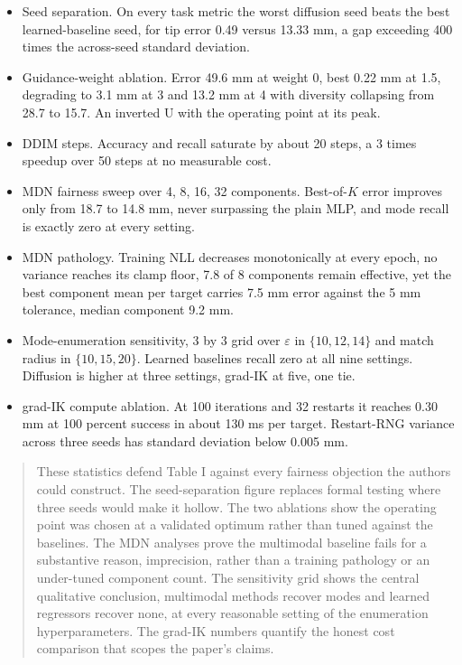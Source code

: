 \documentclass[11pt]{article}
\newcommand{\desc}[1]{\begin{quote}\small #1\end{quote}}
\begin{document}
\begin{itemize}
\item Seed separation. On every task metric the worst diffusion seed beats
the best learned-baseline seed, for tip error 0.49 versus 13.33 mm, a gap
exceeding 400 times the across-seed standard deviation.
\item Guidance-weight ablation. Error 49.6 mm at weight 0, best 0.22 mm at
1.5, degrading to 3.1 mm at 3 and 13.2 mm at 4 with diversity collapsing
from 28.7 to 15.7. An inverted U with the operating point at its peak.
\item DDIM steps. Accuracy and recall saturate by about 20 steps, a 3 times
speedup over 50 steps at no measurable cost.
\item MDN fairness sweep over 4, 8, 16, 32 components. Best-of-$K$ error
improves only from 18.7 to 14.8 mm, never surpassing the plain MLP, and
mode recall is exactly zero at every setting.
\item MDN pathology. Training NLL decreases monotonically at every epoch, no
variance reaches its clamp floor, 7.8 of 8 components remain effective, yet
the best component mean per target carries 7.5 mm error against the 5 mm
tolerance, median component 9.2 mm.
\item Mode-enumeration sensitivity, 3 by 3 grid over $\varepsilon$ in
$\{10,12,14\}$ and match radius in $\{10,15,20\}$. Learned baselines recall
zero at all nine settings. Diffusion is higher at three settings, grad-IK at
five, one tie.
\item grad-IK compute ablation. At 100 iterations and 32 restarts it reaches
0.30 mm at 100 percent success in about 130 ms per target. Restart-RNG
variance across three seeds has standard deviation below 0.005 mm.
\end{itemize}

\desc{These statistics defend Table I against every fairness objection the
authors could construct. The seed-separation figure replaces formal testing
where three seeds would make it hollow. The two ablations show the
operating point was chosen at a validated optimum rather than tuned against
the baselines. The MDN analyses prove the multimodal baseline fails for a
substantive reason, imprecision, rather than a training pathology or an
under-tuned component count. The sensitivity grid shows the central
qualitative conclusion, multimodal methods recover modes and learned
regressors recover none, at every reasonable setting of the enumeration
hyperparameters. The grad-IK numbers quantify the honest cost comparison
that scopes the paper's claims.}
\end{document}
